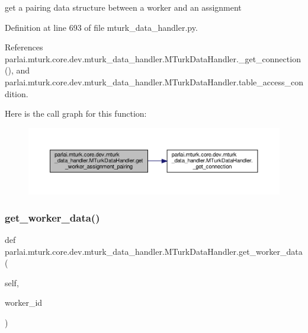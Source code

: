 \begin{DoxyVerb}get a pairing data structure between a worker and an assignment\end{DoxyVerb}
 

Definition at line 693 of file mturk\+\_\+data\+\_\+handler.\+py.



References parlai.\+mturk.\+core.\+dev.\+mturk\+\_\+data\+\_\+handler.\+M\+Turk\+Data\+Handler.\+\_\+get\+\_\+connection(), and parlai.\+mturk.\+core.\+dev.\+mturk\+\_\+data\+\_\+handler.\+M\+Turk\+Data\+Handler.\+table\+\_\+access\+\_\+condition.

Here is the call graph for this function\+:
\nopagebreak
\begin{figure}[H]
\begin{center}
\leavevmode
\includegraphics[width=350pt]{classparlai_1_1mturk_1_1core_1_1dev_1_1mturk__data__handler_1_1MTurkDataHandler_a9aa7011c4fdd163ed18b99bbd697da78_cgraph}
\end{center}
\end{figure}
\mbox{\label{classparlai_1_1mturk_1_1core_1_1dev_1_1mturk__data__handler_1_1MTurkDataHandler_a748e6271a1618272cd17ec412b2c2a25}} 
\subsubsection{\texorpdfstring{get\+\_\+worker\+\_\+data()}{get\_worker\_data()}}
{\footnotesize\ttfamily def parlai.\+mturk.\+core.\+dev.\+mturk\+\_\+data\+\_\+handler.\+M\+Turk\+Data\+Handler.\+get\+\_\+worker\+\_\+data (\begin{DoxyParamCaption}\item[{}]{self,  }\item[{}]{worker\+\_\+id }\end{DoxyParamCaption})}

